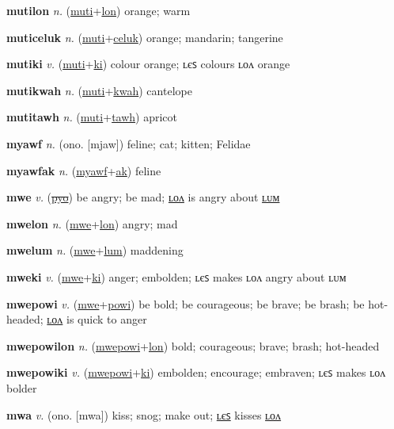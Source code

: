 \textbf{\hypertarget{mutilon}{mutilon}} \textit{n.} (\hyperlink{muti}{muti}+\allowbreak \hyperlink{lon}{lon})
orange; warm

\textbf{\hypertarget{muticeluk}{muticeluk}} \textit{n.} (\hyperlink{muti}{muti}+\allowbreak \hyperlink{celuk}{celuk})
orange; mandarin; tangerine

\textbf{\hypertarget{mutiki}{mutiki}} \textit{v.} (\hyperlink{muti}{muti}+\allowbreak \hyperlink{ki}{ki})
colour orange; ʟєꜱ colours ʟᴏᴧ orange

\textbf{\hypertarget{mutikwah}{mutikwah}} \textit{n.} (\hyperlink{muti}{muti}+\allowbreak \hyperlink{kwah}{kwah})
cantelope

\textbf{\hypertarget{mutitawh}{mutitawh}} \textit{n.} (\hyperlink{muti}{muti}+\allowbreak \hyperlink{tawh}{tawh})
apricot

\textbf{\hypertarget{myawf}{myawf}} \textit{n.} (ono. [mjaw])
feline; cat; kitten; Felidae

\textbf{\hypertarget{myawfak}{myawfak}} \textit{n.} (\hyperlink{myawf}{myawf}+\allowbreak \hyperlink{ak}{ak})
feline

\textbf{\hypertarget{mwe}{mwe}} \textit{v.} (\hyperlink{pyo}{\sout{pyo}})
be angry; be mad; \hyperlink{mwelon}{ʟᴏᴧ} is angry about \hyperlink{mwelum}{ʟᴜᴍ}

\textbf{\hypertarget{mwelon}{mwelon}} \textit{n.} (\hyperlink{mwe}{mwe}+\allowbreak \hyperlink{lon}{lon})
angry; mad

\textbf{\hypertarget{mwelum}{mwelum}} \textit{n.} (\hyperlink{mwe}{mwe}+\allowbreak \hyperlink{lum}{lum})
maddening

\textbf{\hypertarget{mweki}{mweki}} \textit{v.} (\hyperlink{mwe}{mwe}+\allowbreak \hyperlink{ki}{ki})
anger; embolden; ʟєꜱ makes ʟᴏᴧ angry about ʟᴜᴍ

\textbf{\hypertarget{mwepowi}{mwepowi}} \textit{v.} (\hyperlink{mwe}{mwe}+\allowbreak \hyperlink{powi}{powi})
be bold; be courageous; be brave; be brash; be hot-headed; \hyperlink{mwepowilon}{ʟᴏᴧ} is quick to anger

\textbf{\hypertarget{mwepowilon}{mwepowilon}} \textit{n.} (\hyperlink{mwepowi}{mwepowi}+\allowbreak \hyperlink{lon}{lon})
bold; courageous; brave; brash; hot-headed

\textbf{\hypertarget{mwepowiki}{mwepowiki}} \textit{v.} (\hyperlink{mwepowi}{mwepowi}+\allowbreak \hyperlink{ki}{ki})
embolden; encourage; embraven; ʟєꜱ makes ʟᴏᴧ bolder

\textbf{\hypertarget{mwa}{mwa}} \textit{v.} (ono. [mwa])
kiss; snog; make out; \hyperlink{mwales}{ʟєꜱ} kisses \hyperlink{mwalon}{ʟᴏᴧ}

